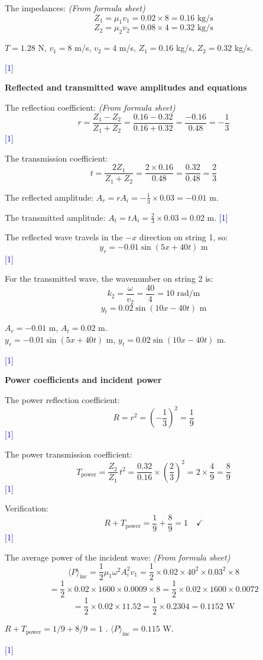 \documentclass[12pt,a4paper]{article}
\newcommand{\markstep}[1]{\hfill\textcolor{blue}{[#1]}}
\newcommand{\finalanswer}[1]{%
  \begin{tcolorbox}[colback=green!5!white,colframe=green!50!black,boxrule=0.5pt]
  #1
  \end{tcolorbox}
}
\newcommand{\fromsheet}{\textit{(From formula sheet)}}
\begin{document}
\begin{parts}
The impedances: \fromsheet
\[
Z_1 = \mu_1 v_1 = 0.02\times 8 = 0.16\text{ kg/s}
\]
\[
Z_2 = \mu_2 v_2 = 0.08\times 4 = 0.32\text{ kg/s}
\]

\finalanswer{$T = 1.28$ N, \quad $v_1 = 8$ m/s, \quad $v_2 = 4$ m/s, \quad $Z_1 = 0.16$ kg/s, \quad $Z_2 = 0.32$ kg/s.}
\markstep{1}

\item \textbf{Reflected and transmitted wave amplitudes and equations} 

The reflection coefficient: \fromsheet
\[
r = \frac{Z_1 - Z_2}{Z_1 + Z_2} = \frac{0.16 - 0.32}{0.16 + 0.32} = \frac{-0.16}{0.48} = -\frac{1}{3}
\]
\markstep{1}

The transmission coefficient:
\[
t = \frac{2Z_1}{Z_1 + Z_2} = \frac{2\times 0.16}{0.48} = \frac{0.32}{0.48} = \frac{2}{3}
\]

The reflected amplitude: $A_r = rA_i = -\frac{1}{3}\times 0.03 = -0.01$ m.

The transmitted amplitude: $A_t = tA_i = \frac{2}{3}\times 0.03 = 0.02$ m.
\markstep{1}

The reflected wave travels in the $-x$ direction on string 1, so:
\[
y_r = -0.01\sin(5x + 40t)\text{ m}
\]
\markstep{1}

For the transmitted wave, the wavenumber on string 2 is:
\[
k_2 = \frac{\omega}{v_2} = \frac{40}{4} = 10\text{ rad/m}
\]
\[
y_t = 0.02\sin(10x - 40t)\text{ m}
\]

\finalanswer{$A_r = -0.01$ m, $A_t = 0.02$ m.\\
$y_r = -0.01\sin(5x + 40t)$ m, \quad $y_t = 0.02\sin(10x - 40t)$ m.}
\markstep{1}

\item \textbf{Power coefficients and incident power} 

The power reflection coefficient:
\[
R = r^2 = \left(-\frac{1}{3}\right)^2 = \frac{1}{9}
\]
\markstep{1}

The power transmission coefficient:
\[
T_{\text{power}} = \frac{Z_2}{Z_1}\,t^2 = \frac{0.32}{0.16}\times\left(\frac{2}{3}\right)^2 = 2\times\frac{4}{9} = \frac{8}{9}
\]
\markstep{1}

Verification:
\[
R + T_{\text{power}} = \frac{1}{9} + \frac{8}{9} = 1 \quad\checkmark
\]
\markstep{1}

The average power of the incident wave: \fromsheet
\[
\langle P\rangle_{\text{inc}} = \frac{1}{2}\mu_1\omega^2 A_i^2 v_1 = \frac{1}{2}\times 0.02\times 40^2\times 0.03^2\times 8
\]
\[
= \frac{1}{2}\times 0.02\times 1600\times 0.0009\times 8 = \frac{1}{2}\times 0.02\times 1600\times 0.0072
\]
\[
= \frac{1}{2}\times 0.02\times 11.52 = \frac{1}{2}\times 0.2304 = 0.1152\text{ W}
\]

\finalanswer{$R + T_{\text{power}} = 1/9 + 8/9 = 1$ \checkmark. \quad $\langle P\rangle_{\text{inc}} = 0.115$ W.}
\markstep{1}

\end{parts}
\end{document}
